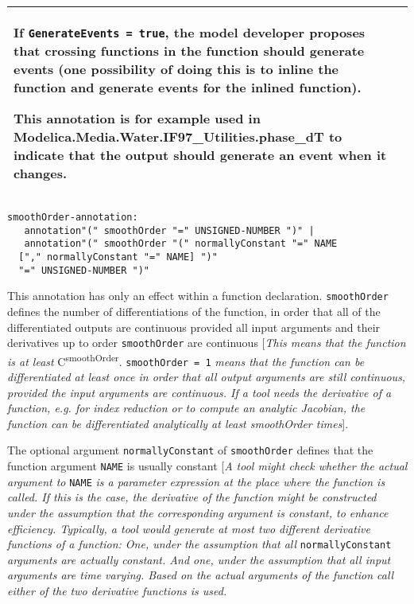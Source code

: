 \begin{longtable}[]{|p{4.2cm}|p{10cm}|}
If \lstinline!GenerateEvents = true!, the model developer proposes that crossing
functions in the function should generate events (one possibility of
doing this is to inline the function and generate events for the inlined
function).

\begin{nonnormative}
This annotation is for example used in
Modelica\allowbreak{}.Media\allowbreak{}.Water\allowbreak{}.IF97\_Utilities.phase\_dT to indicate that
the output should generate an event when it changes.
\end{nonnormative}
\\ \hline

\end{longtable}
\begin{lstlisting}[language=grammar]
smoothOrder-annotation:
   annotation"(" smoothOrder "=" UNSIGNED-NUMBER ")" |
   annotation"(" smoothOrder "(" normallyConstant "=" NAME
  ["," normallyConstant "=" NAME] ")"
  "=" UNSIGNED-NUMBER ")"
\end{lstlisting}
This annotation has only an effect within a function declaration.
\lstinline!smoothOrder! defines the number of differentiations of the function, in
order that all of the differentiated outputs are continuous provided all
input arguments and their derivatives up to order \lstinline!smoothOrder! are
continuous {[}\emph{This means that the function is at least}
C\textsuperscript{smoothOrder}. \lstinline!smoothOrder = 1! \emph{means that the
function can be differentiated at least once in order that all output
arguments are still continuous, provided the input arguments are
continuous. If a tool needs the derivative of a function, e.g. for index
reduction or to compute an analytic Jacobian, the function can be
differentiated analytically at least smoothOrder times}{]}.

The optional argument \lstinline!normallyConstant! of \lstinline!smoothOrder! defines that the
function argument \lstinline!NAME! is usually constant {[}\emph{A tool might check
whether the actual argument to} \lstinline!NAME! \emph{is a parameter expression at the
place where the function is called. If this is the case, the derivative
of the function might be constructed under the assumption that the
corresponding argument is constant, to enhance efficiency. Typically, a
tool would generate at most two different derivative functions of a
function: One, under the assumption that all} \lstinline!normallyConstant! \emph{arguments
are actually constant. And one, under the assumption that all input
arguments are time varying. Based on the actual arguments of the
function call either of the two derivative functions is used.}

